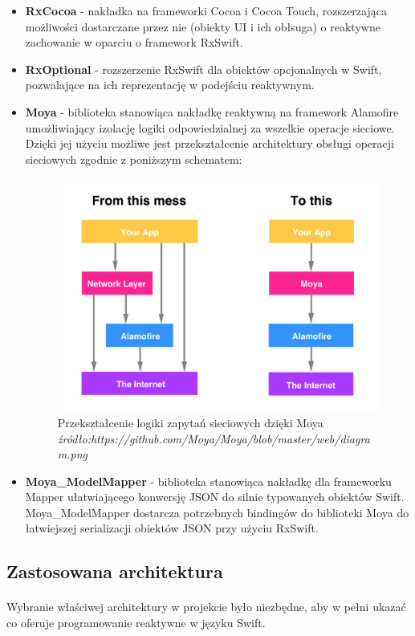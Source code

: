 \documentclass[12pt,oneside,a4paper]{report}
\begin{document}
\begin{itemize}
	\item  \textbf{RxCocoa} - nakładka na frameworki Cocoa i Cocoa Touch, rozszerzająca możliwości dostarczane przez nie (obiekty UI i ich obłsuga) o reaktywne zachowanie w oparciu o framework RxSwift.  
	\item  \textbf{RxOptional} - rozszerzenie RxSwift dla obiektów opcjonalnych w Swift, pozwalające na ich reprezentację w podejściu reaktywnym.
	\item  \textbf{Moya} - biblioteka stanowiąca nakładkę reaktywną na framework Alamofire\cite{alamofire} umożliwiający izolację logiki odpowiedzialnej za wszelkie operacje sieciowe. Dzięki jej użyciu możliwe jest przekształcenie architektury obsługi operacji sieciowych zgodnie z poniższym schematem:
	\begin{figure}[ht!]
		\centering
		\includegraphics[width=13cm]{moyaDiagram}
		\caption{Przekształcenie logiki zapytań sieciowych dzięki Moya 
			\textit{źródło:https://github.com/Moya/Moya/blob/master/web/diagram.png}}
		\label{moyaDiagram}
	\end{figure}
	\item  \textbf{Moya\_ModelMapper} - biblioteka stanowiąca nakładkę dla frameworku Mapper\cite{mapper} ułatwiającego konwersję JSON do silnie typowanych obiektów Swift. Moya\_ModelMapper dostarcza potrzebnych bindingów do biblioteki Moya do łatwiejszej serializacji obiektów JSON przy użyciu RxSwift.
\end{itemize}
\pagebreak
\subsection{Zastosowana architektura}
\paragraph{}Wybranie właściwej architektury w projekcie było niezbędne, aby w pełni ukazać co oferuje programowanie reaktywne w języku Swift. 
\end{document}
